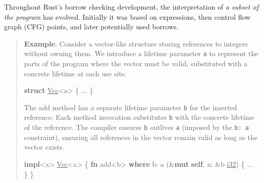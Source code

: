 \documentclass[
  11pt,
  twoside,symmetric]{report}
\newenvironment{Shaded}{}{}
\newcommand{\DataTypeTok}[1]{\underline{#1}}
\newcommand{\KeywordTok}[1]{\textbf{#1}}
\newcommand{\NormalTok}[1]{#1}
\newcommand{\OperatorTok}[1]{#1}
\newcommand{\OtherTok}[1]{#1}
\begin{document}
Throughout Rust's borrow checking development, the interpretation of
\emph{a subset of the program} has evolved. Initially it was based on
expressions, then control flow graph (CFG) points, and later potentially
used borrows.

\begin{quote}
\textbf{Example}: Consider a vector-like structure storing references to
integers without owning them. We introduce a lifetime parameter
\texttt{\textquotesingle{}a} to represent the parts of the program where
the vector must be valid, substituted with a concrete lifetime at each
use site.

\begin{Shaded}
\begin{Highlighting}[]
\KeywordTok{struct} \DataTypeTok{Vec}\OperatorTok{\textless{}}\OtherTok{\textquotesingle{}a}\OperatorTok{\textgreater{}} \OperatorTok{\{} \OperatorTok{...} \OperatorTok{\}}
\end{Highlighting}
\end{Shaded}

The add method has a separate lifetime parameter
\texttt{\textquotesingle{}b} for the inserted reference. Each method
invocation substitutes \texttt{\textquotesingle{}b} with the concrete
lifetime of the reference. The compiler ensures
\texttt{\textquotesingle{}b} outlives \texttt{\textquotesingle{}a}
(imposed by the \texttt{\textquotesingle{}b:\ \textquotesingle{}a}
constraint), ensuring all references in the vector remain valid as long
as the vector exists.

\begin{Shaded}
\begin{Highlighting}[]
\KeywordTok{impl}\OperatorTok{\textless{}}\OtherTok{\textquotesingle{}a}\OperatorTok{\textgreater{}} \DataTypeTok{Vec}\OperatorTok{\textless{}}\OtherTok{\textquotesingle{}a}\OperatorTok{\textgreater{}} \OperatorTok{\{}
  \KeywordTok{fn}\NormalTok{ add}\OperatorTok{\textless{}}\OtherTok{\textquotesingle{}b}\OperatorTok{\textgreater{}} \KeywordTok{where} \OtherTok{\textquotesingle{}b}\OperatorTok{:} \OtherTok{\textquotesingle{}a}\NormalTok{ (}\OperatorTok{\&}\KeywordTok{mut} \KeywordTok{self}\OperatorTok{,}\NormalTok{ x}\OperatorTok{:} \OperatorTok{\&}\OtherTok{\textquotesingle{}b} \DataTypeTok{i32}\NormalTok{) }\OperatorTok{\{} \OperatorTok{...} \OperatorTok{\}}
\OperatorTok{\}}
\end{Highlighting}
\end{Shaded}
\end{quote}
\end{document}
